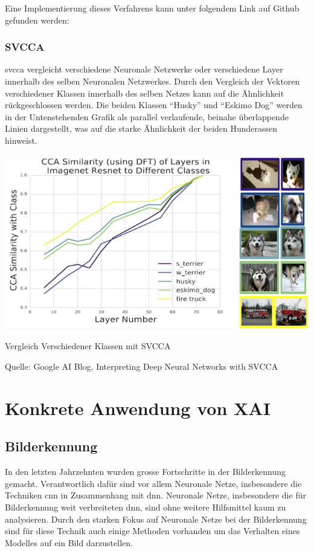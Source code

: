 \documentclass[
  12pt, %
  a4paper, %
  oneside, %
  openany, 
  numbers=noenddot, %
  BCOR=5mm, %
  parskip=half*, %
  thesis, %
]{bfhbook}
\begin{document}
Eine Implementierung dieses Verfahrens kann unter folgendem Link auf Github gefunden werden: \cite{tcavLink}

\subsection{SVCCA}
\acrlong{svcca} \parencite{Raghu2017} vergleicht verschiedene Neuronale Netzwerke oder verschiedene Layer innerhalb des selben Neuronalen Netzwerkes.
\break
Durch den Vergleich der Vektoren verschiedener Klassen innerhalb des selben Netzes kann auf die Ähnlichkeit rückgeschlossen werden. Die beiden Klassen ``Husky'' und ``Eskimo Dog'' werden in der Untenstehenden Grafik als parallel verlaufende, beinahe überlappende Linien dargestellt, was auf die starke Ähnlichkeit der beiden Hunderassen hinweist.
\begin{center}
\begin{minipage}[t]{\linewidth}
 	\includegraphics[width=\textwidth]{Bilder/svcca-similarities.png}
    	\caption{Vergleich Verschiedener Klassen mit SVCCA}
    	\caption*{Quelle: Google AI Blog, Interpreting Deep Neural Networks with SVCCA}
\end{minipage}
\end{center}
\cite{svccaLink}

\chapter{Konkrete Anwendung von XAI}

\section{Bilderkennung}
In den letzten Jahrzehnten wurden grosse Fortschritte in der Bilderkennung gemacht. Verantwortlich dafür sind vor allem Neuronale Netze, insbesondere die Techniken \acrfull{cnn} in Zusammenhang mit {dnn}. Neuronale Netze, insbesondere die für Bilderkennung weit verbreiteten \acrfull{dnn}, sind ohne weitere Hilfsmittel kaum zu analysieren.
Durch den starken Fokus auf Neuronale Netze bei der Bilderkennung sind für diese Technik auch einige Methoden vorhanden um das Verhalten eines Modelles  auf ein Bild darzustellen.
\end{document}
